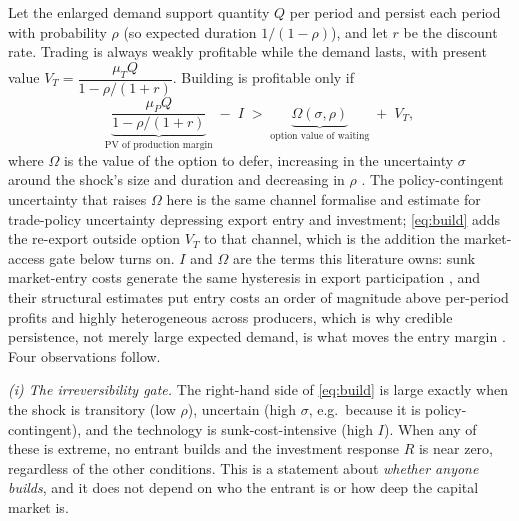 \documentclass[12pt]{article}
\begin{document}
Let the enlarged demand support quantity $Q$ per period and persist each period with
probability $\rho$ (so expected duration $1/(1-\rho)$), and let $r$ be the discount rate.
Trading is always weakly profitable while the demand lasts, with present value
$V_T = \dfrac{\mu_T Q}{1-\rho/(1+r)}$. Building is profitable only if
\begin{equation}
\underbrace{\frac{\mu_P Q}{1-\rho/(1+r)}}_{\text{PV of production margin}} \;-\; I
\;>\; \underbrace{\Omega(\sigma,\rho)}_{\text{option value of waiting}} \;+\; V_T ,
\label{eq:build}
\end{equation}
where $\Omega$ is the value of the option to defer, increasing in the uncertainty $\sigma$
around the shock's size and duration and decreasing in $\rho$ \citep{dixitpindyck1994}. The
policy-contingent uncertainty that raises $\Omega$ here is the same channel
\citet{handleylimao2015,handleylimao2017} formalise and estimate for trade-policy uncertainty
depressing export entry and investment; \eqref{eq:build} adds the re-export outside option
$V_T$ to that channel, which is the addition the market-access gate below turns on. $I$ and
$\Omega$ are the terms this literature owns: sunk market-entry costs generate the same
hysteresis in export participation \citep{robertstybout1997}, and their structural
estimates put entry costs an order of magnitude above per-period profits and highly
heterogeneous across producers, which is why credible persistence, not merely large expected
demand, is what moves the entry margin \citep{dasrobertstybout2007}. Four
observations follow.

\emph{(i) The irreversibility gate.} The right-hand side of \eqref{eq:build} is large exactly
when the shock is transitory (low $\rho$), uncertain (high $\sigma$, e.g.\ because it is
policy-contingent), and the technology is sunk-cost-intensive (high $I$). When any of these is
extreme, no entrant builds and the investment response $R$ is near zero, regardless of the
other conditions. This is a statement about \emph{whether anyone builds}, and it does not
depend on who the entrant is or how deep the capital market is.
\end{document}
